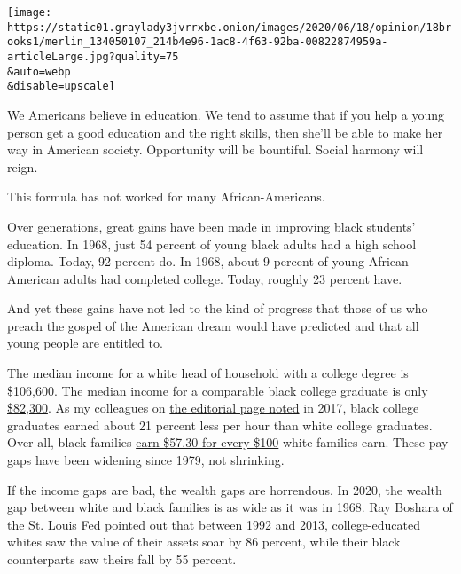 \texttt{[image: https://static01.graylady3jvrrxbe.onion/images/2020/06/18/opinion/18brooks1/merlin\_134050107\_214b4e96-1ac8-4f63-92ba-00822874959a-articleLarge.jpg?quality=75\\\&auto=webp\\\&disable=upscale]}

We Americans believe in education. We tend to assume that if you help a
young person get a good education and the right skills, then she'll be
able to make her way in American society. Opportunity will be bountiful.
Social harmony will reign.

This formula has not worked for many African-Americans.

Over generations, great gains have been made in improving black
students' education. In 1968, just 54 percent of young black adults had
a high school diploma. Today, 92 percent do. In 1968, about 9 percent of
young African-American adults had completed college. Today, roughly 23
percent have.

And yet these gains have not led to the kind of progress that those of
us who preach the gospel of the American dream would have predicted and
that all young people are entitled to.

The median income for a white head of household with a college degree is
\$106,600. The median income for a comparable black college graduate is
\href{https://www.pewsocialtrends.org/2016/06/27/1-demographic-trends-and-economic-well-being/}{only
\$82,300}. As my colleagues on
\href{https://www.nytimes3xbfgragh.onion/2017/09/20/opinion/college-racial-income-gap.html}{the
editorial page noted} in 2017, black college graduates earned about 21
percent less per hour than white college graduates. Over all, black
families
\href{https://www.nytimes3xbfgragh.onion/interactive/2017/09/18/upshot/black-white-wealth-gap-perceptions.html}{earn
\$57.30 for every \$100} white families earn. These pay gaps have been
widening since 1979, not shrinking.

If the income gaps are bad, the wealth gaps are horrendous. In 2020, the
wealth gap between white and black families is as wide as it was in
1968. Ray Boshara of the St. Louis Fed
\href{https://www.washingtonpost.com/business/2020/06/04/economic-divide-black-households/\%20https:/www.washingtonpost.com/opinions/black-college-graduates-are-losing-wealth-heres-what-can-help/2017/04/12/cd83ba64-1ba4-11e7-9887-1a5314b56a08_story.html?arc404=true}{pointed
out} that between 1992 and 2013, college-educated whites saw the value
of their assets soar by 86 percent, while their black counterparts saw
theirs fall by 55 percent.

